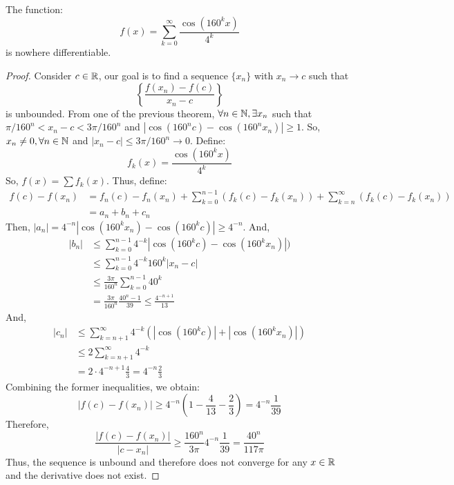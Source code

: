 \begin{theorem}
    The function:
    \begin{equation}
        f(x) = \sum \limits_{k = 0}^\infty \frac{\cos(160^k x)}{4^k}
    \end{equation}
    is nowhere differentiable.
\end{theorem}

\begin{proof}
    Consider $c \in \mathbb{R}$, our goal is to find a sequence $\{x_n\}$ with $x_n \to c$ such that
    \begin{equation*}
        \left \{
            \frac{f(x_n) - f(c)}{x_n - c}
        \right \}
    \end{equation*}
    is unbounded. From one of the previous theorem, $\forall n \in \mathbb{N}, \exists x_n$ such that $\pi/160^n < x_n - c < 3\pi/160^n$ and $|\cos (160^n c) - \cos (160^n x_n)| \geq 1$. So, $x_n \neq 0, \forall n \in \mathbb{N}$ and $|x_n - c| \leq 3 \pi/160^n \to 0$. Define:
    \begin{equation*}
        f_k(x) = \frac{\cos (160^k x)}{4^k}
    \end{equation*}
    So, $f(x) = \sum f_k(x)$. Thus, define:
    \begin{align*}
        f(c) - f(x_n) &= f_n(c) - f_n(x_n) + \sum \limits_{k=0}^{n-1}(f_k(c) - f_k(x_n)) + \sum \limits_{k=n}^\infty(f_k(c) - f_k(x_n)) \\
        &= a_n + b_n + c_n
    \end{align*}
    Then, $|a_n| = 4^{-n} |\cos (160^k x_n) - \cos (160^k c)| \geq 4^{-n}$. And,
    \begin{align*}
        |b_n| &\leq \sum \limits_{k=0}^{n-1} 4^{-k}|\cos (160^k c) - \cos (160^k x_n)|) \\
        &\leq \sum \limits_{k=0}^{n-1}4^{-k} 160^k |x_n - c| \\ 
        &\leq \frac{3 \pi}{160^n} \sum \limits_{k=0}^{n-1}40^k \\
        &= \frac{3 \pi}{160^n} \frac{40^n - 1}{39} \leq \frac{4^{-n+1}}{13}
    \end{align*}
    And,
    \begin{align*}
        |c_n| &\leq \sum \limits_{k = n+1}^\infty 4^{-k}(|\cos(160^k c)| + |\cos (160^k x_n)|) \\
        &\leq 2 \sum \limits_{k = n+1}^\infty 4^{-k} \\
        &= 2\cdot 4^{-n+1}\frac{4}{3} = 4^{-n} \frac{2}{3}
    \end{align*}
    Combining the former inequalities, we obtain:
    \begin{equation*}
        |f(c) - f(x_n)| \geq 4^{-n} \left(1 - \frac{4}{13} - \frac{2}{3} \right) = 4^{-n}\frac{1}{39}
    \end{equation*}
    Therefore,
    \begin{equation*}
        \frac{|f(c) - f(x_n)|}{|c-x_n|} \geq \frac{160^n}{3\pi} 4^{-n}\frac{1}{39} = \frac{40^n}{117 \pi}
    \end{equation*}
    Thus, the sequence is unbound and therefore does not converge for any $x \in \mathbb{R}$ and the derivative does not exist.
\end{proof}

